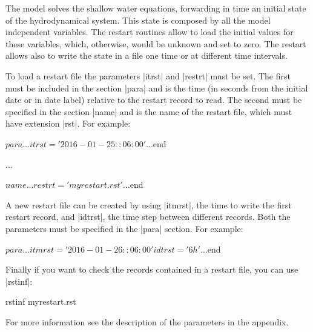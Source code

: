 
%
%
%
%
%
%
%

The model solves the shallow water equations, forwarding in time an
initial state of the hydrodynamical system. This state is composed by all
the model independent variables.  The restart routines allow to load the
initial values for these variables, which, otherwise, would be unknown
and set to zero.  The restart allows also to write the state in a file
one time or at different time intervals.

To load a restart file the parameters |itrst| and |restrt| must be
set. The first must be included in the section |para| and is the time (in
seconds from the initial date or in date label) relative to the restart
record to read.  The second must be specified in the section |name|
and is the name of the restart file, which must have extension |rst|.
For example:

\begin{code}
$para
...
itrst = '2016-01-25::06:00'
...
$end

...

$name
...
restrt = 'myrestart.rst'
...
$end
\end{code}

A new restart file can be created by using |itmrst|, the time to write
the first restart record, and |idtrst|, the time step between different
records. Both the parameters must be specified in the |para| section.
For example:

\begin{code}
$para
...
itmrst = '2016-01-26::06:00'
idtrst = '6h'
...
$end
\end{code}

Finally if you want to check the records contained in a restart file,
you can use |rstinf|:

\begin{code}
    rstinf myrestart.rst
\end{code}


For more information see the description of the parameters in the appendix.

